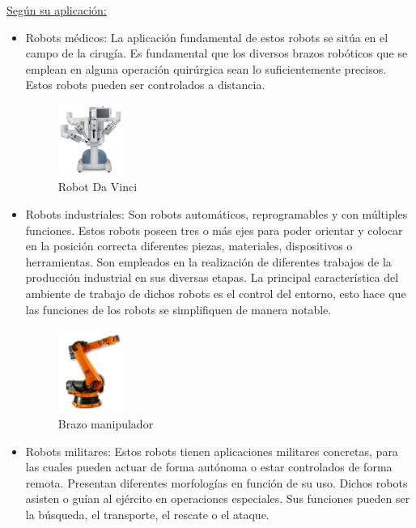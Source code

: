 \underline{Según su aplicación:} 
\begin{itemize}
\item Robots médicos: La aplicación fundamental de estos robots se sitúa en el campo de la cirugía. Es fundamental que los diversos brazos robóticos que se emplean en alguna operación quirúrgica sean lo suficientemente precisos. Estos robots pueden ser controlados a distancia.
\begin{figure}[H]
  \begin{center}
    \includegraphics[width=0.2\textwidth]{figures/Introduccion/da_vinci.png}
		\caption{Robot Da Vinci}
		\label{fig.da_vinci}
		\end{center}
\end{figure}
\item Robots industriales: Son robots automáticos, reprogramables y con múltiples funciones. Estos robots poseen tres o más ejes para poder orientar y colocar en la posición correcta diferentes piezas, materiales, dispositivos o herramientas. Son empleados en la realización de diferentes trabajos de la producción industrial en sus diversas etapas. La principal característica del ambiente de trabajo de dichos robots es el control del entorno, esto hace que las funciones de los robots se simplifiquen de manera notable.  
\begin{figure}[H]
  \begin{center}
    \includegraphics[width=0.2\textwidth]{figures/Introduccion/brazo_manipulador.png}
		\caption{Brazo manipulador}
		\label{fig.brazo_manipulador}
		\end{center}
\end{figure}
\item Robots militares: Estos robots tienen aplicaciones militares concretas, para las cuales pueden actuar de forma autónoma o estar controlados de forma remota. Presentan diferentes morfologías en función de su uso. Dichos robots asisten o guían al ejército en operaciones especiales. Sus funciones pueden ser la búsqueda, el transporte, el rescate o el ataque.

\end{itemize}
